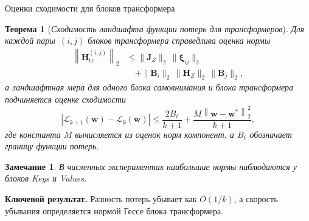 \documentclass[10pt,pdf,hyperref={unicode}]{beamer}
\newtheorem{rustheorem}{Теорема}
\newtheorem{rusremark}{Замечание}
\newcommand{\key}[1]{\textbf{\color{darkgreen}#1}}
\begin{document}
\begin{frame}{Оценки сходимости для блоков трансформера}
\justifying
\small
\begin{rustheorem}[\emph{Сходимость ландшафта функции потерь для трансформеров}]
    \justifying
    Для каждой пары~$(i,j)$ блоков трансформера справедлива оценка нормы
    \begin{align*}
        \left\|\mathbf{H}_{\mathrm{tr}}^{(i,j)}\right\|_2 &\leqslant \|\mathbf{J}_Z\|_2\,\|\boldsymbol{\xi}_{ij}\|_2 \\
        &\quad + \|\mathbf{B}_i\|_2\,\|\mathbf{H}_Z\|_2\,\|\mathbf{B}_j\|_2,
    \end{align*}
    а ландшафтная мера для одного блока самовнимания и блока трансформера подчиняется оценке сходимости
    \[
        \left| \mathcal{L}_{k+1}(\mathbf{w}) - \mathcal{L}_k(\mathbf{w}) \right| \leqslant \frac{2B_{\ell}}{k+1} + \frac{M \left\| \mathbf{w} - \mathbf{w}^* \right\|_2^2}{k+1},
    \]
    где константа $M$ вычисляется из оценок норм компонент, а $B_{\ell}$ обозначает границу функции потерь.
\end{rustheorem}

\begin{rusremark}
    \justifying
    В численных экспериментах наибольшие нормы наблюдаются у блоков Keys и Values.
\end{rusremark}

\vspace{0.15em}
\key{Ключевой результат.} Разность потерь убывает как $O(1/k)$, а скорость убывания определяется нормой Гессе блока трансформера.
\end{frame}
\end{document}
